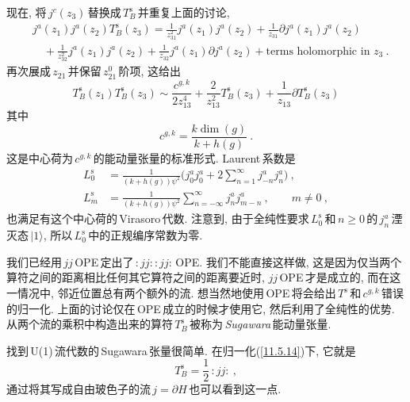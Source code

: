 现在, 将$\,j^{c}(z_{3})\,$替换成$\,T_{B}^{\mathrm{s}}\,$并重复上面的讨论,
\begin{align}
    &j^{a}(z_{1})j^{a}(z_{2})T_{B}^{\mathrm{s}}(z_{3})=\frac{1}{z_{31}^{2}}j^{a}(z_{1})j^{a}(z_{2})
    +\frac{1}{z_{31}}\partial j^{a}(z_{1}) j^{a}(z_{2}) \nonumber \\
    &\quad +\frac{1}{z_{32}^{2}} j^{a}(z_{1})j^{a}(z_{2})+\frac{1}{z_{32}}j^{a}(z_{1})\partial j^{a}(z_{2})
    +\text{terms holomorphic in } z_{3} \:. \label{11.5.23}
\end{align}
再次展成$\,z_{21}\,$并保留$\,z_{21}^{0}\,$阶项, 这给出
\begin{equation}
    T_{B}^{\mathrm{s}}(z_{1})T_{B}^{\mathrm{s}}(z_{3}) \sim \frac{c^{g,k}}{2z_{13}^{4}}+\frac{2}{z_{13}^{2}}T_{B}^{\mathrm{s}}(z_{3})+\frac{1}{z_{13}}\partial T_{B}^{\mathrm{s}}(z_{3}) \label{11.5.24}
\end{equation}
其中
\begin{equation}
    c^{g,k}=\frac{k\operatorname{dim}(g)}{k+h(g)} \:. \label{11.5.25}
\end{equation}
这是中心荷为$\,c^{g,k}\,$的能动量张量的标准形式. Laurent\,系数是
\begin{subequations}
\begin{align}
    L_{0}^{\mathrm{s}} &= \frac{1}{(k+h(g))\psi^{2}}\biggl(j_{0}^{a}j_{0}^{a}
    +2\sum_{n=1}^{\infty}j_{-n}^{a}j_{n}^{a}\biggr) \:, \label{11.5.26a} \\
    L_{m}^{\mathrm{s}} &= \frac{1}{(k+h(g))\psi^{2}}\sum_{n=-\infty}^{\infty}j_{n}^{a}j_{m-n}^{a}\:,\qquad m\neq0\:,
    \label{11.5.26b}
\end{align} \label{11.5.26}
\end{subequations}
也满足有这个中心荷的\,Virasoro\,代数. 注意到, 由于全纯性要求$\,L_{0}^{\mathrm{s}}\,$和$\,n\geq0\,$的$\,j_{n}^{a}\,$湮灭态$\,\lvert 1\rangle$, 所以$\,L_{0}^{\mathrm{s}}\,$中的正规编序常数为零.

我们已经用$\,jj\,$OPE\,定出了$\,:jj::jj:\,$OPE. 我们不能直接这样做, 这是因为仅当两个算符之间的距离相比任何其它算符之间的距离要近时, $jj\,$OPE\,才是成立的, 而在这一情况中, 邻近位置总有两个额外的流. 想当然地使用\,OPE\,将会给出$\,T^{\mathrm{s}}\,$和$\,c^{g,k}\,$错误的归一化. 上面的讨论仅在\,OPE\,成立的时候才使用它, 然后利用了全纯性的优势. 从两个流的乘积中构造出来的算符$\,T_{B}^{\mathrm{s}}\,$被称为\,\textit{Sugawara}\,能动量张量.

找到\,U(1)\,流代数的\,Sugawara\,张量很简单. 在归一化(\ref{11.5.14})下, 它就是
\begin{equation}
    T_{B}^{\mathrm{s}} =\frac{1}{2}\,:jj: \:, \label{11.5.27}
\end{equation}
通过将其写成自由玻色子的流$\,j=\partial H\,$也可以看到这一点. 

